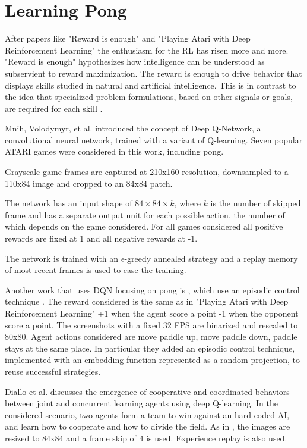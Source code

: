 \section{Learning Pong}
After papers like "Reward is enough"\cite{silver2021reward} and "Playing Atari with Deep Reinforcement Learning"\cite{mnih2013playing} the enthusiasm for the RL has risen more and more.
"Reward is enough" hypothesizes how intelligence can be understood as subservient to reward maximization. The reward is enough to drive behavior that displays skills studied in natural and artificial intelligence. This is in contrast to the idea that specialized problem formulations, based on other signals or goals, are required for each skill \cite{silver2021reward}.

Mnih, Volodymyr, et al. \cite{mnih2013playing} introduced the concept of Deep Q-Network, a convolutional neural network, trained with a variant of Q-learning.
Seven popular ATARI games were considered in this work, including pong.

Grayscale game frames are captured at 210x160 resolution, downsampled to a 110x84 image and cropped to an 84x84 patch.

The network has an input shape of $84\times 84\times k$, where $k$ is the number of skipped frame and has a separate output unit for each possible action, 
the number of which depends on the game considered. 
For all games considered all positive rewards are fixed at 1 and all negative rewards at -1.

The network is trained with an $\epsilon$-greedy annealed strategy and a replay memory of most recent frames is used to ease the training.

Another work that uses DQN focusing on pong is \cite{makarov2017learning}, which use an episodic control technique \cite{blundell2016model}.
%
The reward considered is the same as in "Playing Atari with Deep Reinforcement Learning" +1 when the agent score a point -1 when the opponent score a point.
The screenshots with a fixed 32 FPS are binarized and rescaled to 80x80.
Agent actions considered are move paddle up, move paddle down, paddle stays at the same place.
In particular they added an episodic control technique, implemented with an embedding function represented as a random projection, to reuse successful strategies.


Diallo et al. \cite{diallo2017learning} discusses the emergence of cooperative and coordinated behaviors between joint and concurrent learning
agents using deep Q-learning. 
%
In the considered scenario, two agents form a team to win against an hard-coded AI,
and learn how to cooperate and how to divide the field.
%
As in \cite{mnih2013playing}, the images are resized to 84x84 and a frame skip of 4 is used.
Experience replay is also used.

